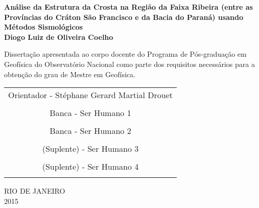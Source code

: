 \begin{titlepage}
 \vfill
  \begin{center}

   {\Large \textbf{Análise da Estrutura da Crosta na Região da Faixa Ribeira (entre as Províncias do Cráton São Francisco e da Bacia do Paraná) usando Métodos Sismológicos}} \\[2.5cm]

   {\large \textbf{Diogo Luiz de Oliveira Coelho}}\\[4cm]

   \hspace{.45\textwidth} %
   \begin{minipage}{.5\textwidth}
   \large Dissertação apresentada ao corpo docente do Programa de Pós-graduação em Geofísica do Observatório Nacional como parte dos requisitos necessários para a obtenção do grau de Mestre em Geofísica.\\[1cm]
  \end{minipage}

\begin{tabular}{c}
\hline
Orientador - Stéphane Gerard Martial Drouet \\ 
\bigskip\\
\hline
Banca - Ser Humano 1 \\ 
\bigskip\\
\hline
Banca - Ser Humano 2 \\ 
\bigskip\\
\hline
(Suplente) - Ser Humano 3 \\ 
\bigskip\\
\hline
(Suplente) - Ser Humano 4 \\ 
\bigskip\\
\end{tabular}
  \vfill

\vspace{2cm}

RIO DE JANEIRO \\
2015 \\

\end{center}
\end{titlepage} 